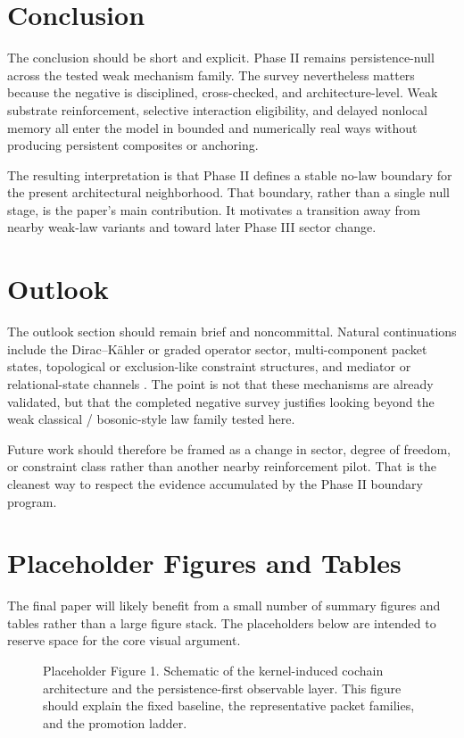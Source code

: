 \documentclass[11pt]{article}
\newcommand{\placeholderbox}[1]{%
  \fbox{\rule{0pt}{#1}\rule{0.92\linewidth}{0pt}}%
}
\begin{document}
\section{Conclusion}

The conclusion should be short and explicit. Phase II remains persistence-null across the tested weak mechanism family. The survey nevertheless matters because the negative is disciplined, cross-checked, and architecture-level. Weak substrate reinforcement, selective interaction eligibility, and delayed nonlocal memory all enter the model in bounded and numerically real ways without producing persistent composites or anchoring.

The resulting interpretation is that Phase II defines a stable no-law boundary for the present architectural neighborhood. That boundary, rather than a single null stage, is the paper's main contribution. It motivates a transition away from nearby weak-law variants and toward later Phase III sector change.

\section{Outlook}

The outlook section should remain brief and noncommittal. Natural continuations include the Dirac--K\"ahler or graded operator sector, multi-component packet states, topological or exclusion-like constraint structures, and mediator or relational-state channels \cite{dirac_kahler_placeholder}. The point is not that these mechanisms are already validated, but that the completed negative survey justifies looking beyond the weak classical / bosonic-style law family tested here.

Future work should therefore be framed as a change in sector, degree of freedom, or constraint class rather than another nearby reinforcement pilot. That is the cleanest way to respect the evidence accumulated by the Phase II boundary program.

\section{Placeholder Figures and Tables}

The final paper will likely benefit from a small number of summary figures and tables rather than a large figure stack. The placeholders below are intended to reserve space for the core visual argument.

\begin{figure}[h]
\centering
\placeholderbox{1.8in}
\caption{Placeholder Figure 1. Schematic of the kernel-induced cochain architecture and the persistence-first observable layer. This figure should explain the fixed baseline, the representative packet families, and the promotion ladder.}
\label{fig:architecture}
\end{figure}
\end{document}
